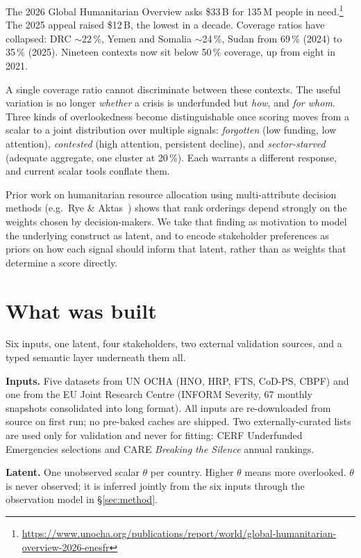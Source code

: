\documentclass[11pt,a4paper]{article}
\begin{document}
The 2026 Global Humanitarian Overview asks \$33\,B for 135\,M people in
need.\footnote{\url{https://www.unocha.org/publications/report/world/global-humanitarian-overview-2026-enesfr}}
The 2025 appeal raised \$12\,B, the lowest in a decade. Coverage ratios have
collapsed: DRC $\sim$22\,\%, Yemen and Somalia $\sim$24\,\%, Sudan from 69\,\%
(2024) to 35\,\% (2025). Nineteen contexts now sit below 50\,\% coverage, up
from eight in 2021.

A single coverage ratio cannot discriminate between these contexts. The useful
variation is no longer \emph{whether} a crisis is underfunded but \emph{how},
and \emph{for whom}. Three kinds of overlookedness become distinguishable once
scoring moves from a scalar to a joint distribution over multiple signals:
\emph{forgotten} (low funding, low attention), \emph{contested} (high attention,
persistent decline), and \emph{sector-starved} (adequate aggregate, one cluster
at 20\,\%). Each warrants a different response, and current scalar tools
conflate them.

Prior work on humanitarian resource allocation using multi-attribute decision
methods (e.g.\ Rye \& Aktas~\cite{rye2022}) shows that rank orderings depend
strongly on the weights chosen by decision-makers. We take that finding as
motivation to model the underlying construct as latent, and to encode
stakeholder preferences as priors on how each signal should inform that
latent, rather than as weights that determine a score directly.

\section{What was built}

Six inputs, one latent, four stakeholders, two external validation sources,
and a typed semantic layer underneath them all.

\textbf{Inputs.} Five datasets from UN OCHA (HNO, HRP, FTS, CoD-PS, CBPF) and
one from the EU Joint Research Centre (INFORM Severity, 67 monthly snapshots
consolidated into long format). All inputs are re-downloaded from source
on first run; no pre-baked caches are shipped. Two externally-curated lists
are used only for validation and never for fitting: CERF Underfunded
Emergencies selections and CARE \emph{Breaking the Silence} annual rankings.

\textbf{Latent.} One unobserved scalar $\theta$ per country. Higher $\theta$
means more overlooked. $\theta$ is never observed; it is inferred jointly
from the six inputs through the observation model in \S\ref{sec:method}.
\end{document}
